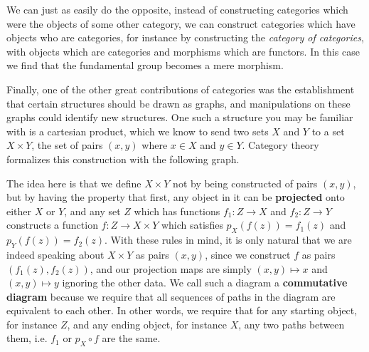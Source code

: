 \documentclass[11pt]{article}
\begin{document}
We can just as easily do the opposite, instead of constructing categories which were the objects of some other category, we can construct categories which have objects who are categories, for instance by constructing the \emph{category of categories}, with objects which are categories and morphisms which are functors. In this case we find that the fundamental group becomes a mere morphism.

Finally, one of the other great contributions of categories was the establishment that certain structures should be drawn as graphs, and manipulations on these graphs could identify new structures. One such a structure you may be familiar with is a cartesian product, which we know to send two sets $X$ and $Y$ to a set $X \times Y$, the set of pairs $(x,y)$ where $x \in X$ and $y \in Y$. Category theory formalizes this construction with the following graph. \begin{detect tikz}\end{detect tikz}
The idea here is that we define $X \times Y$ not by being constructed of pairs $(x,y)$, but by having the property that first, any object in it can be \textbf{projected} onto either $X$ or $Y$, and any set $Z$ which has functions $f_1 \colon Z \to X$ and $f_2 \colon Z \to Y$ constructs a function $f \colon Z \to X \times Y$ which satisfies $p_X(f(z)) = f_1(z)$ and $p_Y(f(z)) = f_2(z)$. With these rules in mind, it is only natural that we are indeed speaking about $X \times Y$ as pairs $(x,y)$, since we construct $f$ as pairs $(f_1(z), f_2(z))$, and our projection maps are simply $(x,y) \mapsto x$ and $(x,y) \mapsto y$ ignoring the other data. We call such a diagram a \textbf{commutative diagram} because we require that all sequences of paths in the diagram are equivalent to each other. In other words, we require that for any starting object, for instance $Z$, and any ending object, for instance $X$, any two paths between them, i.e. $f_1$ or $p_X\circ f$ are the same. 
\end{document}
